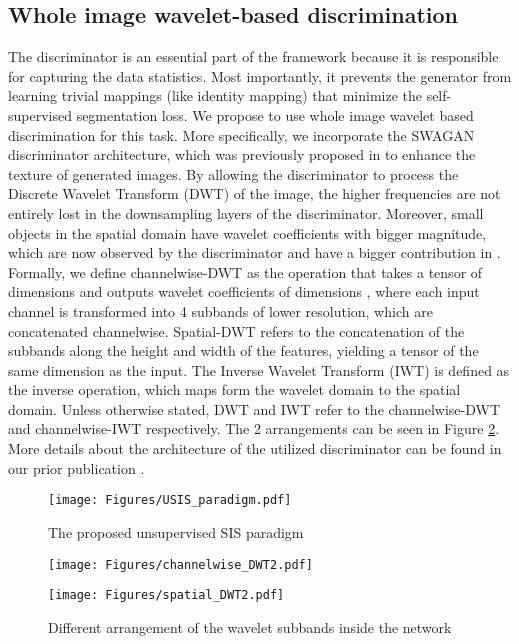 \documentclass{article}
\begin{document}
\subsection{Whole image wavelet-based discrimination}
The discriminator is an essential part of the framework because it is responsible for capturing the data statistics. Most importantly, it prevents the generator from learning trivial mappings (like identity mapping) that minimize the self-supervised segmentation loss. We propose to use whole image wavelet based discrimination for this task. More specifically, we incorporate the SWAGAN discriminator architecture, which was previously proposed in \cite{Gal2021SWAGANAS} to enhance the texture of generated images. By allowing the discriminator to process the Discrete Wavelet Transform (DWT) of the image, the higher frequencies are not entirely lost in the downsampling layers of the discriminator. Moreover, small objects in the spatial domain have wavelet coefficients with bigger magnitude, which are now observed by the discriminator and have a bigger contribution in .
Formally, we define channelwise-DWT as the operation that takes a tensor of dimensions  and outputs wavelet coefficients of dimensions , where each input channel is transformed into 4 subbands of lower resolution, which are concatenated channelwise. Spatial-DWT refers to the concatenation of the subbands along the height and width of the features, yielding a tensor of the same dimension as the input. The Inverse Wavelet Transform (IWT) is defined as the inverse operation, which maps form the wavelet domain to the spatial domain. Unless otherwise stated, DWT and IWT refer to the channelwise-DWT and channelwise-IWT respectively. The 2 arrangements can be seen in Figure \ref{fig:DWT}. More details about the architecture of the utilized discriminator can be found in our prior publication \cite{eskandar2021usis}.
\begin{figure}
    \centering
    \begin{minipage}{\linewidth}
    \texttt{[image: Figures/USIS\_paradigm.pdf]}
    \end{minipage}
    \caption{The proposed unsupervised SIS paradigm}
    \label{fig:semantic_consistency}
\end{figure}
 \begin{figure}[t]
    \centering
    \begin{minipage}{0.4\linewidth}
    \centering
    \texttt{[image: Figures/channelwise\_DWT2.pdf]}
    \label{fig:DWT:channel}
    \end{minipage}
    \qquad
    \begin{minipage}{0.4\linewidth}
    \centering
    \texttt{[image: Figures/spatial\_DWT2.pdf]}
    \label{fig:DWT:spatial}
    \end{minipage}
    \caption{Different arrangement of the wavelet subbands inside the network}
    \vspace{-2em}
    \label{fig:DWT}
\end{figure}
\end{document}

